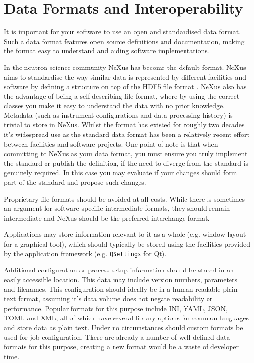 \documentclass[jnr]{iosart2x}
\begin{document}
\section{Data Formats and Interoperability}
\label{Data Formats and Interoperability}

It is important for your software to use an open and standardised data format.
Such a data format features open source definitions and documentation, making the format easy to understand and aiding software implementations.

In the neutron science community NeXus \cite{K_nnecke_2015} has become the default format.
NeXus aims to standardise the way similar data is represented by different facilities and software by defining a structure on top of the HDF5 file format \cite{HDF5}.
NeXus also has the advantage of being a self describing file format, where by using the correct classes you make it easy to understand the data with no prior knowledge.
Metadata (such as instrument configurations and data processing history) is trivial to store in NeXus.
Whilst the format has existed for roughly two decades it's widespread use as the standard data format has been a relatively recent effort between facilities and software projects.
One point of note is that when committing to NeXus as your data format, you must ensure you truly implement the standard or publish the definition, if the need to diverge from the standard is genuinely required.
In this case you may evaluate if your changes should form part of the standard and propose such changes.

Proprietary file formats should be avoided at all costs.
While there is sometimes an argument for software specific intermediate formats, they should remain intermediate and NeXus should be the preferred interchange format.

Applications may store information relevant to it as a whole (e.g. window layout for a graphical tool), which should typically be stored using the facilities provided by the application framework (e.g. \texttt{QSettings} for Qt).

Additional configuration or process setup information should be stored in an easily accessible location.
This data may include version numbers, parameters and filenames.
This configuration should ideally be in a human readable plain text format, assuming it's data volume does not negate readability or performance.
Popular formats for this purpose include INI, YAML, JSON, TOML and XML, all of which have several library options for common languages and store data as plain text.
Under no circumstances should custom formats be used for job configuration.
There are already a number of well defined data formats for this purpose, creating a new format would be a waste of developer time.
\end{document}
